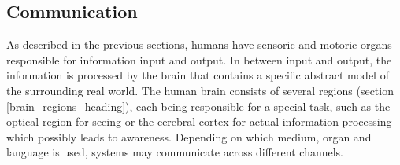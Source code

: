 %
%
%
%
%
%
%

\subsection{Communication}
\label{communication_heading}

As described in the previous sections, humans have sensoric and motoric organs
responsible for information input and output. In between input and output, the
information is processed by the brain that contains a specific abstract model
of the surrounding real world. The human brain consists of several regions
(section \ref{brain_regions_heading}), each being responsible for a special
task, such as the optical region for seeing or the cerebral cortex for actual
information processing which possibly leads to awareness. Depending on which
medium, organ and language is used, systems may communicate across different
channels.





